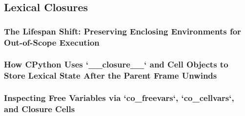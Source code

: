 \subsection{Lexical Closures}
\subsubsection{The Lifespan Shift: Preserving Enclosing Environments for Out-of-Scope Execution}
\subsubsection{How CPython Uses `__closure__` and Cell Objects to Store Lexical State After the Parent Frame Unwinds}
\subsubsection{Inspecting Free Variables via `co_freevars`, `co_cellvars`, and Closure Cells}
